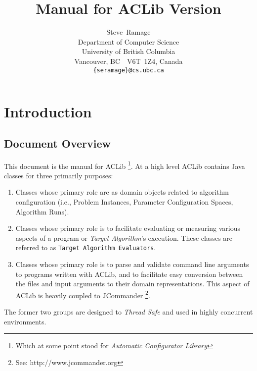 \documentclass[11pt,letterpaper,oneside]{article}
\begin{document}

\title{Manual for ACLib Version }
\author{
Steve~Ramage\\
Department of Computer Science\\
University of British Columbia\\
Vancouver, BC\ \ V6T~1Z4, Canada\\
\texttt{\{seramage\}@cs.ubc.ca}
}


\maketitle

\tableofcontents

\section{Introduction}

\subsection{Document Overview}

This document is the manual for ACLib \footnote{Which at some point stood for \emph{Automatic Configurator Library}}. At a high level ACLib contains Java classes for three primarily purposes:

\begin{enumerate}
\item Classes whose primary role are as domain objects related to algorithm configuration (i.e., Problem Instances, Parameter Configuration Spaces, Algorithm Runs).

\item Classes whose primary role is to facilitate evaluating or measuring various aspects of a program or \emph{Target Algorithm}'s execution. These classes are referred to as \texttt{Target Algorithm Evaluators}. 

\item Classes whose primary role is to parse and validate command line arguments to programs written with ACLib, and to facilitate easy conversion between the files and input arguments to their domain representations. This aspect of ACLib is heavily coupled to JCommander \footnote{See: http://www.jcommander.org}.

\end{enumerate}

The former two groups are designed to \emph{Thread Safe} and used in highly concurrent environments.
\end{document}
